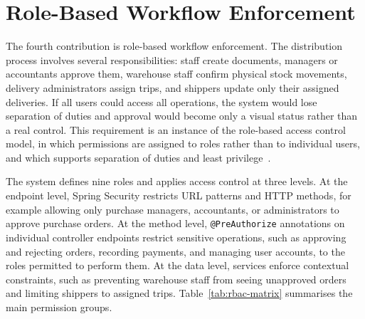 \section{Role-Based Workflow Enforcement}
The fourth contribution is role-based workflow enforcement. The distribution
process involves several responsibilities: staff create documents, managers or
accountants approve them, warehouse staff confirm physical stock movements,
delivery administrators assign trips, and shippers update only their assigned
deliveries. If all users could access all operations, the system would lose
separation of duties and approval would become only a visual status rather than
a real control. This requirement is an instance of the role-based access control
model, in which permissions are assigned to roles rather than to individual
users, and which supports separation of duties and least
privilege~\cite{sandhu2000nist}.

The system defines nine roles and applies access control at three levels. At the
endpoint level, Spring Security restricts URL patterns and HTTP methods, for
example allowing only purchase managers, accountants, or administrators to
approve purchase orders. At the method level, \texttt{@PreAuthorize} annotations on individual
controller endpoints restrict sensitive operations, such as approving and
rejecting orders, recording payments, and managing user accounts, to the roles
permitted to perform them. At the data level, services enforce contextual
constraints, such as preventing warehouse staff from seeing unapproved orders
and limiting shippers to assigned trips. Table~\ref{tab:rbac-matrix} summarises
the main permission groups.


